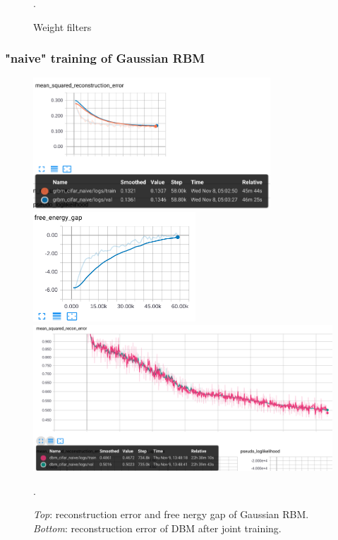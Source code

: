 \begin{figure}[h]
\begin{mdframed}
\caption{Weight filters}.
\end{mdframed}
\end{figure}

\clearpage
\subsubsection{"naive" training of Gaussian RBM}
\begin{figure}[h]
\begin{mdframed}
\centering
\includegraphics[width=3.5in]{dbm-cifar-naive/grbm_msre.png}
\quad
\includegraphics[width=2.4in]{dbm-cifar-naive/grbm_feg.png}
\\[4em]
\includegraphics[width=5.4in]{dbm-cifar-naive/dbm_msre.png}
\caption{\emph{Top}: reconstruction error and free nergy gap of Gaussian RBM. \emph{Bottom}: reconstruction error of DBM after joint training.}.
\end{mdframed}
\end{figure}


